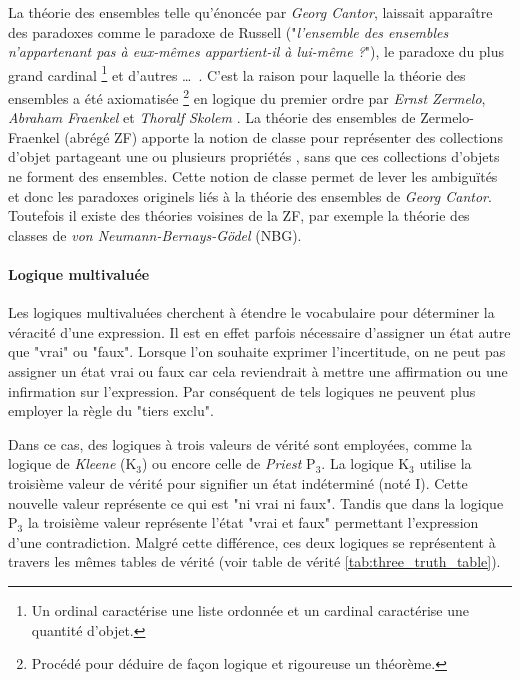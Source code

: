 \begin{refsegment}
\begin{shadedfigure}[H]
    \end{shadedfigure}

    La théorie des ensembles telle qu'énoncée par \textit{Georg Cantor}, laissait apparaître des paradoxes comme le paradoxe de Russell ("\textit{l'ensemble des ensembles n'appartenant pas à eux-mêmes appartient-il à lui-même ?}"), le paradoxe du plus grand cardinal \footnote{Un ordinal caractérise une liste ordonnée et un cardinal caractérise une quantité d'objet.} et d'autres \ldots~. C’est la raison pour laquelle la théorie des ensembles a été axiomatisée \footnote{Procédé pour déduire de façon logique et rigoureuse un théorème.} en logique du premier ordre par \textit{Ernst Zermelo}, \textit{ Abraham Fraenkel} et \textit{Thoralf Skolem} \cite{hayden1968zermelo,kanamori2008higher}. La théorie des ensembles de Zermelo-Fraenkel (abrégé ZF) apporte la notion de classe pour représenter des collections d'objet partageant une ou plusieurs propriétés , sans que ces collections d’objets ne forment des ensembles. Cette notion de classe permet de lever les ambiguïtés et donc les paradoxes originels liés à la théorie des ensembles de \textit{Georg Cantor}. Toutefois il existe des théories voisines de la ZF, par exemple la théorie des classes \cite{bernays1937system,van1967frege} de \textit{von Neumann-Bernays-Gödel} (NBG).

        
    \paragraph{Logique multivaluée}\label{par:logic_multivalued}
    
    Les logiques multivaluées cherchent à étendre le vocabulaire pour déterminer la véracité d'une expression.  Il est en effet parfois nécessaire d'assigner un état autre que "vrai" ou "faux". Lorsque l'on souhaite exprimer l'incertitude, on ne peut pas assigner un état vrai ou faux car cela reviendrait à mettre une affirmation ou une infirmation sur l'expression. Par conséquent de tels logiques ne peuvent plus employer la règle du "tiers exclu".
    
    Dans ce cas, des logiques à trois valeurs de vérité sont employées, comme la logique de \textit{Kleene} (K$_{3}$) ou encore celle de \textit{Priest} P$_{3}$. La logique K$_{3}$ utilise la troisième valeur de vérité pour signifier un état indéterminé (noté I).  Cette nouvelle valeur représente ce qui est "ni vrai ni faux".  Tandis que dans la logique P$_{3}$ la troisième valeur représente l'état "vrai et faux" permettant l'expression d'une contradiction. Malgré cette différence, ces deux logiques se représentent à travers les mêmes tables de vérité (voir table de vérité \ref{tab:three_truth_table}).
    

\end{refsegment}
